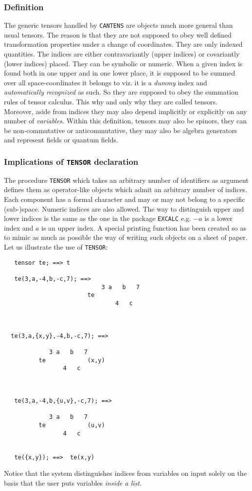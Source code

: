 \subsubsection{Definition}
The generic tensors  handled by \texttt{CANTENS} are objects 
much more general than usual tensors. The reason is that they are not supposed to 
obey well defined transformation properties under a change of coordinates.
They are only indexed quantities. The indices are either 
contravariantly (upper indices) or covariantly (lower indices) placed. 
They can be symbolic or numeric. When a given index is found both 
in one upper and in one lower place, it is supposed to be summed over 
all space-coordinates it belongs to viz. it is a \emph{dummy}
index 
and \emph{automatically recognized} as such.  
So they are supposed to obey the summation rules of tensor calculus.
This why and only why they are called tensors. Moreover, aside from 
indices they may also depend implicitly or explicitly on any number of
\emph{variables}. Within this definition,
tensors may also be spinors, they can be non-commutative or anticommutative,
they may also be algebra generators and represent fields or quantum fields.   

\subsubsection{Implications of \texttt{TENSOR} declaration}

The procedure \texttt{TENSOR} which takes an arbitrary number of identifiers as argument
defines them as operator-like objects which admit an arbitrary number of indices.
Each component has a formal character and may or may not belong to a 
specific (sub-)space. Numeric indices are also allowed. The way to distinguish 
upper and lower indices is the same as the one in the package
\texttt{EXCALC} e.g. $-a$ is a lower index and $a$ is an 
upper index.
A special printing function has been created so as to mimic as much as possible
the way of writing such objects on a sheet of paper.
Let us illustrate the use of \texttt{TENSOR}:
\begin{verbatim}
   tensor te; ==> t

   te(3,a,-4,b,-c,7); ==> 
                            3 a   b   7
                        te
                                4   c



  te(3,a,{x,y},-4,b,-c,7); ==>

             3 a   b   7
          te            (x,y)
                 4   c



   te(3,a,-4,b,{u,v},-c,7); ==>

             3 a   b   7
          te            (u,v)
                 4   c


   te({x,y}); ==>  te(x,y)
\end{verbatim} 
Notice that the system distinguishes indices from variables on input 
solely on the basis that the user puts variables \emph{inside a list}.

